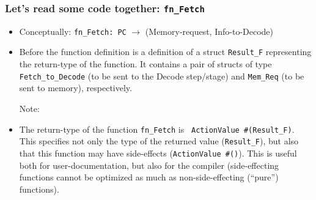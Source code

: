 
\begin{frame}[fragile]
\frametitle{Let's read some code together: {\tt fn\_Fetch}}

\begin{center}\scriptsize


 \vspace{1ex}

 \begin{minipage}{0.8\textwidth}
  \begin{itemize}

   \item Conceptually: {\tt fn\_Fetch: PC} $\rightarrow$ (Memory-request, Info-to-Decode)

   \item Before the function definition is a definition of a struct
     {\tt Result\_F} representing the return-type of the function.  It
     contains a pair of structs of type {\tt Fetch\_to\_Decode} (to be
     sent to the Decode step/stage) and {\tt Mem\_Req} (to be sent to
     memory), respectively.

     Note: 

   \item The return-type of the function {\tt fn\_Fetch} is {\tt
      ActionValue~\#(Result\_F)}. This specifies not only the type of
      the returned value ({\tt Result\_F}), but also that this
      function may have side-effects ({\tt ActionValue~\#()}).  This
      is useful both for user-documentation, but also for the compiler
      (side-effecting functions cannot be optimized as much as
      non-side-effecting (``pure'') functions).


\end{itemize}
\end{minipage}
\end{center}
\end{frame}
